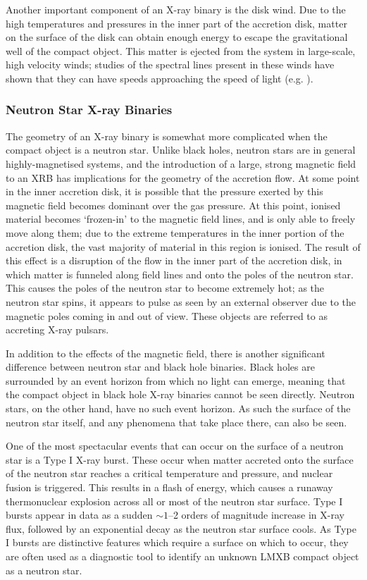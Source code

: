 \par Another important component of an X-ray binary is the disk wind.  Due to the high temperatures and pressures in the inner part of the accretion disk, matter on the surface of the disk can obtain enough energy to escape the gravitational well of the compact object.  This matter is ejected from the system in large-scale, high velocity winds; studies of the spectral lines present in these winds have shown that they can have speeds approaching the speed of light (e.g. \citealp{Degenaar_BPSpec}).

\subsubsection{Neutron Star X-ray Binaries}

\par The geometry of an X-ray binary is somewhat more complicated when the compact object is a neutron star.  Unlike black holes, neutron stars are in general highly-magnetised systems, and the introduction of a large, strong magnetic field to an XRB has implications for the geometry of the accretion flow.  At some point in the inner accretion disk, it is possible that the pressure exerted by this magnetic field becomes dominant over the gas pressure.  At this point, ionised material becomes `frozen-in' to the magnetic field lines, and is only able to freely move along them; due to the extreme temperatures in the inner portion of the accretion disk, the vast majority of material in this region is ionised.  The result of this effect is a disruption of the flow in the inner part of the accretion disk, in which matter is funneled along field lines and onto the poles of the neutron star.  This causes the poles of the neutron star to become extremely hot; as the neutron star spins, it appears to pulse as seen by an external observer due to the magnetic poles coming in and out of view.  These objects are referred to as accreting X-ray pulsars.
\par In addition to the effects of the magnetic field, there is another significant difference between neutron star and black hole binaries.  Black holes are surrounded by an event horizon from which no light can emerge, meaning that the compact object in black hole X-ray binaries cannot be seen directly.  Neutron stars, on the other hand, have no such event horizon.  As such the surface of the neutron star itself, and any phenomena that take place there, can also be seen.
\par One of the most spectacular events that can occur on the surface of a neutron star is a Type I X-ray burst.  These occur when matter accreted onto the surface of the neutron star reaches a critical temperature and pressure, and nuclear fusion is triggered.  This results in a flash of energy, which causes a runaway thermonuclear explosion across all or most of the neutron star surface.  Type I bursts appear in data as a sudden $\sim1$--2 orders of magnitude increase in X-ray flux, followed by an exponential decay as the neutron star surface cools.  As Type I bursts are distinctive features which require a surface on which to occur, they are often used as a diagnostic tool to identify an unknown LMXB compact object as a neutron star.

